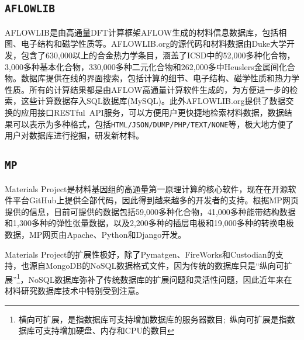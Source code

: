 \subsection{\tt{AFLOWLIB}}
\textrm{AFLOWLIB}是由高通量\textrm{DFT}计算框架\textrm{AFLOW}\cite{CMS58-218_2012,CMS58-227_2012,Nat-Mater12-191_2013}生成的材料信息数据库，包括相图、电子结构和磁学性质等。\textrm{AFLOWLIB.org}的源代码和材料数据由\textrm{Duke}大学开发\cite{AFLOWORG_URL}，包含了630,000以上的合金热力学条目，涵盖了\textrm{ICSD}中的52,000多种化合物，3,000多种基本化合物，330,000多种二元化合物和262,000多中\textrm{Heuslers}金属间化合物。数据库提供在线的界面搜索，包括计算的细节、电子结构、磁学性质和热力学性质。所有的计算结果都是由\textrm{AFLOW}高通量计算软件生成的，为方便进一步的检索，这些计算数据存入\textrm{SQL}数据库(\textrm{MySQL})。此外\textrm{AFLOWLIB.org}提供了数据交换的应用接口\textrm{RESTful~API}服务\cite{CMS93-178_2014}，可以方便用户更快捷地检索材料数据，数据结果可以表示为多种格式，包括\texttt{HTML/JSON/DUMP/PHP/TEXT/NONE}等，极大地方便了用户对数据库进行挖掘，研发新材料。

\subsection{\tt{MP}}
\textrm{Materials Project}是材料基因组的高通量第一原理计算的核心软件\cite{MP_URL}，现在在开源软件平台\textrm{GitHub}\cite{MP_Github}上提供全部代码，因此得到越来越多的开发者的支持。根据\textrm{MP}网页提供的信息\cite{MP_URL}，目前可提供的数据包括59,000多种化合物，41,000多种能带结构数据和1,300多种的弹性张量数据，以及2,200多种的插层电极和19,000多种的转换电极数据，\textrm{MP}网页由\textrm{Apache}、\textrm{Python}和\textrm{Django}开发。

\textrm{Materials Project}的扩展性极好，除了\textrm{Pymatgen}、\textrm{FireWorks}和\textrm{Custodian}的支持，也源自\textrm{MongoDB}的\textrm{NoSQL}数据格式文件，因为传统的数据库只是“纵向可扩展”\footnote{横向可扩展，是指数据库可支持增加数据库的服务器数目;~纵向可扩展是指数据库可支持增加硬盘、内存和\textrm{CPU}的数目}，\textrm{NoSQL}数据库弥补了传统数据库的扩展问题和灵活性问题，因此近年来在材料研究数据库技术中特别受到注意。

